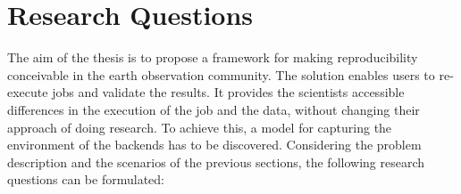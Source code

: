 \documentclass[draft,final]{vutinfth} %
\begin{document}


\newpage
\section{Research Questions}\label{research question}\label{Aim}
The aim of the thesis is to propose a framework for making reproducibility conceivable in the earth observation community. The solution enables users to re-execute jobs and validate the results. It provides the scientists accessible differences in the execution of the job and the data, without changing their approach of doing research. To achieve this, a model for capturing the environment of the backends has to be discovered. Considering the problem description and the scenarios of the previous sections, the following research questions can be formulated:
\end{document}
